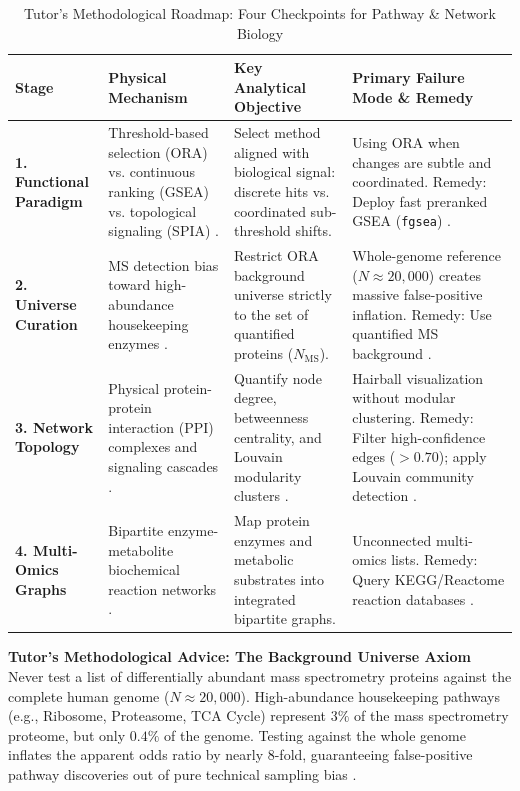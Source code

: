 \documentclass[11pt,oneside]{book}
\begin{document}
\begin{table}[ht]
\centering
\caption{Tutor's Methodological Roadmap: Four Checkpoints for Pathway \& Network Biology}
\label{tab:pathway_roadmap}
\small
\begin{tabularx}{\textwidth}{l p{3.8cm} p{4.2cm} X}
\toprule
\textbf{Stage} & \textbf{Physical Mechanism} & \textbf{Key Analytical Objective} & \textbf{Primary Failure Mode \& Remedy} \\
\midrule
\textbf{1. Functional Paradigm} & Threshold-based selection (ORA) vs. continuous ranking (GSEA) vs. topological signaling (SPIA) \cite{subramanian2005gene, khatri2012ten, tarca2009signaling}. & Select method aligned with biological signal: discrete hits vs. coordinated sub-threshold shifts. & Using ORA when changes are subtle and coordinated. Remedy: Deploy fast preranked GSEA (\texttt{fgsea}) \cite{korotkevich2021fast}. \\
\addlinespace
\textbf{2. Universe Curation} & MS detection bias toward high-abundance housekeeping enzymes \cite{young2010gene}. & Restrict ORA background universe strictly to the set of quantified proteins ($N_{\text{MS}}$). & Whole-genome reference ($N \approx 20,000$) creates massive false-positive inflation. Remedy: Use quantified MS background \cite{yu2012clusterprofiler}. \\
\addlinespace
\textbf{3. Network Topology} & Physical protein-protein interaction (PPI) complexes and signaling cascades \cite{barabasi2004network, szklarczyk2021string}. & Quantify node degree, betweenness centrality, and Louvain modularity clusters \cite{blondel2008fast}. & Hairball visualization without modular clustering. Remedy: Filter high-confidence edges ($>0.70$); apply Louvain community detection \cite{traag2019louvain}. \\
\addlinespace
\textbf{4. Multi-Omics Graphs} & Bipartite enzyme-metabolite biochemical reaction networks \cite{singh2019diablo, xia2009metaboanalyst}. & Map protein enzymes and metabolic substrates into integrated bipartite graphs. & Unconnected multi-omics lists. Remedy: Query KEGG/Reactome reaction databases \cite{kanehisa2000kegg, fabregat2018reactome}. \\
\bottomrule
\end{tabularx}
\end{table}

\begin{notebox}
\textbf{Tutor's Methodological Advice: The Background Universe Axiom}\\
Never test a list of differentially abundant mass spectrometry proteins against the complete human genome ($N \approx 20,000$). High-abundance housekeeping pathways (e.g., Ribosome, Proteasome, TCA Cycle) represent $3\%$ of the mass spectrometry proteome, but only $0.4\%$ of the genome. Testing against the whole genome inflates the apparent odds ratio by nearly 8-fold, guaranteeing false-positive pathway discoveries out of pure technical sampling bias \cite{young2010gene, yu2012clusterprofiler}.
\end{notebox}
\end{document}
